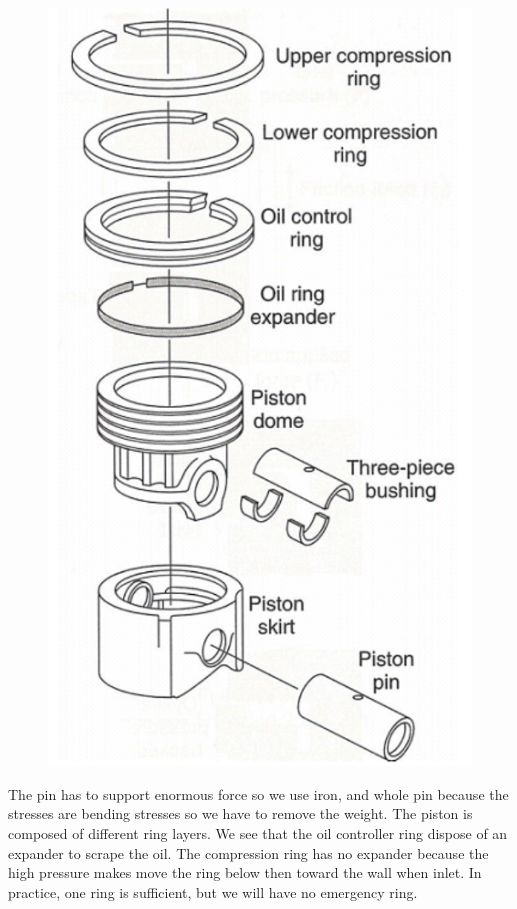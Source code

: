 			\begin{figure}
			\vspace{-9mm}
			\includegraphics[scale=0.2]{ch1/14}
			\end{figure}
The pin has to support enormous force so we use iron, and whole pin because the stresses are bending stresses so we have to remove the weight. The piston is composed of different ring layers. We see that the oil controller ring dispose of an expander to scrape the oil. The compression ring has no expander because the high pressure makes move the ring below then toward the wall when inlet. In practice, one ring is sufficient, but we will have no emergency ring. 

